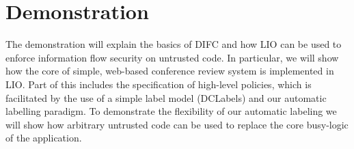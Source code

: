\section{Demonstration}
\label{sec:demo}
The demonstration will explain the basics of DIFC and how LIO can be
used to enforce information flow security on untrusted code.
%
In particular, we will show how the core of simple, web-based
conference review system is implemented in LIO.
%
Part of this includes the specification of high-level policies, which
is facilitated by the use of a simple label model (DCLabels) and our
automatic labelling paradigm.
%
To demonstrate the flexibility of our automatic labeling we will show
how arbitrary untrusted code can be used to replace the core
busy-logic of the application.
